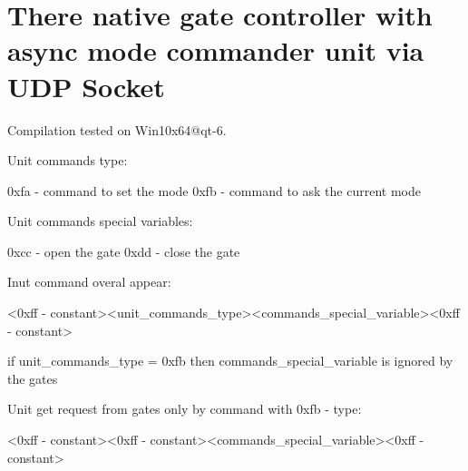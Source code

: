 \chapter{There native gate controller with async mode commander unit via UDP Socket}
\hypertarget{a00036}{}\label{a00036}
\label{a00036_autotoc_md0}%
%


Compilation tested on Win10x64@qt-\/6.

Unit commands type\+: \begin{DoxyVerb}0xfa - command to set the mode
0xfb - command to ask the current mode
\end{DoxyVerb}


Unit commands special variables\+: \begin{DoxyVerb}0xcc - open the gate
0xdd - close the gate
\end{DoxyVerb}


Inut command overal appear\+: \begin{DoxyVerb}<0xff - constant><unit_commands_type><commands_special_variable><0xff - constant>
\end{DoxyVerb}
 if unit\+\_\+commands\+\_\+type = 0xfb then commands\+\_\+special\+\_\+variable is ignored by the gates

Unit get request from gates only by command with 0xfb -\/ type\+: \begin{DoxyVerb}<0xff - constant><0xff - constant><commands_special_variable><0xff - constant>
\end{DoxyVerb}
 